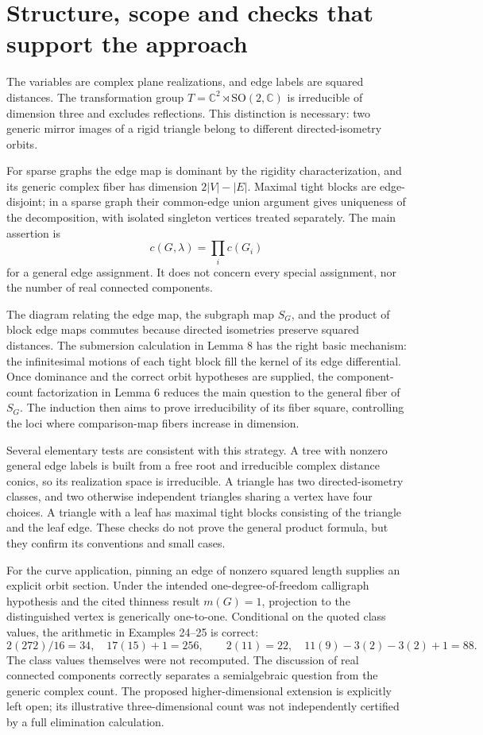 \documentclass[10pt]{article}
\begin{document}
\section*{Structure, scope and checks that support the approach}
The variables are complex plane realizations, and edge labels are squared distances. The transformation group \(T=\mathbb C^2\rtimes\mathrm{SO}(2,\mathbb C)\) is irreducible of dimension three and excludes reflections. This distinction is necessary: two generic mirror images of a rigid triangle belong to different directed-isometry orbits.\par
For sparse graphs the edge map is dominant by the rigidity characterization, and its generic complex fiber has dimension \(2|V|-|E|\). Maximal tight blocks are edge-disjoint; in a sparse graph their common-edge union argument gives uniqueness of the decomposition, with isolated singleton vertices treated separately. The main assertion is \[c(G,\lambda)=\prod_i c(G_i)\] for a general edge assignment. It does not concern every special assignment, nor the number of real connected components.\par
The diagram relating the edge map, the subgraph map \(S_G\), and the product of block edge maps commutes because directed isometries preserve squared distances. The submersion calculation in Lemma 8 has the right basic mechanism: the infinitesimal motions of each tight block fill the kernel of its edge differential. Once dominance and the correct orbit hypotheses are supplied, the component-count factorization in Lemma 6 reduces the main question to the general fiber of \(S_G\). The induction then aims to prove irreducibility of its fiber square, controlling the loci where comparison-map fibers increase in dimension.\par
Several elementary tests are consistent with this strategy. A tree with nonzero general edge labels is built from a free root and irreducible complex distance conics, so its realization space is irreducible. A triangle has two directed-isometry classes, and two otherwise independent triangles sharing a vertex have four choices. A triangle with a leaf has maximal tight blocks consisting of the triangle and the leaf edge. These checks do not prove the general product formula, but they confirm its conventions and small cases.\par
For the curve application, pinning an edge of nonzero squared length supplies an explicit orbit section. Under the intended one-degree-of-freedom calligraph hypothesis and the cited thinness result \(m(G)=1\), projection to the distinguished vertex is generically one-to-one. Conditional on the quoted class values, the arithmetic in Examples 24–25 is correct: \[2(272)/16=34,\quad 17(15)+1=256,\qquad
 2(11)=22,\quad 11(9)-3(2)-3(2)+1=88.\] The class values themselves were not recomputed. The discussion of real connected components correctly separates a semialgebraic question from the generic complex count. The proposed higher-dimensional extension is explicitly left open; its illustrative three-dimensional count was not independently certified by a full elimination calculation.\par
\end{document}
